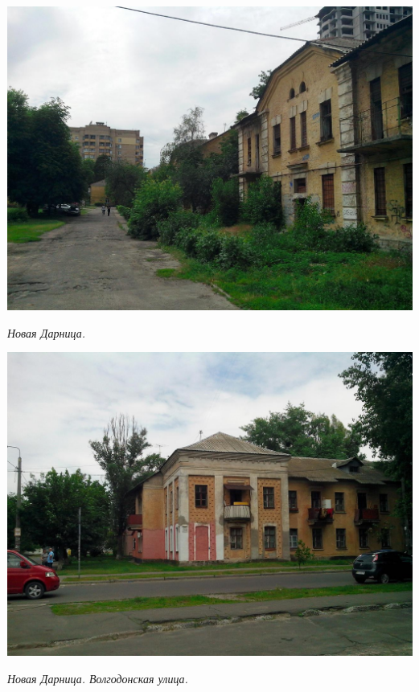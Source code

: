 \begin{center}
\includegraphics[width=\linewidth]{lpix/IMG_20160613_143926.jpg}

\textit{Новая Дарница.}
\end{center}
\newpage

\begin{center}
\includegraphics[width=\linewidth]{lpix/IMG_20160613_145115.jpg}

\textit{Новая Дарница. Волгодонская улица.}
\end{center}


